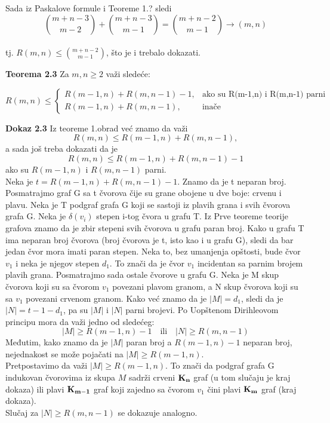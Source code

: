 \documentclass[12pt,a4paper]{article}
\begin{document}
	Sada iz Paskalove formule i Teoreme 1.? sledi 
	\[{m+n-3\choose m-2}+{m+n-3\choose m-1}={m+n-2\choose m-1}\rightarrow (m,n)\] 
	\\
	\vspace{0.7em} tj. $R(m,n) \leq {m+n-2\choose m-1}$, što je i trebalo dokazati. 
	
	{\noindent\fontsize{12pt}{12pt}\textbf{Teorema 2.3}}
	Za $m,n\geq 2$  važi sledeće:
	
	\[
   	 R(m,n)\leq 
		\begin{cases}
    		R(m-1,n)+R(m,n-1)-1,& \text{ako su R(m-1,n) i R(m,n-1) parni}\\
    	R(m-1,n)+R(m,n-1),      & \text{inače}
	\end{cases}
	\]
	
	{\noindent\fontsize{12pt}{12pt}\textbf{Dokaz 2.3}}
	Iz teoreme 1.obrad već znamo da važi
	\[R(m,n)\leq R(m-1,n)+R(m,n-1),\]
	a sada još treba dokazati da je
	\[R(m,n)\leq R(m-1,n)+R(m,n-1)-1\] 
	ako su $R(m-1,n)$ i $R(m,n-1)$ parni.
	\vspace{0.5em}
	\\
	\noindent Neka je $t=R(m-1,n)+R(m,n-1)-1$.
	Znamo da je t neparan broj. Posmatrajmo graf G sa t čvorova čije su grane obojene u dve boje: crvenu i plavu. Neka je T podgraf grafa G koji se sastoji iz plavih grana i svih čvorova grafa G. Neka je $\delta(v_i)$ stepen i-tog čvora u grafu T. Iz Prve teoreme teorije grafova znamo da je zbir stepeni svih čvorova u grafu paran broj. Kako u grafu T ima neparan broj čvorova (broj čvorova je t, isto kao i u grafu G), sledi da bar jedan čvor mora imati paran stepen. Neka to, bez umanjenja opštosti, bude čvor $v_1$ i neka je njegov stepen $d_1$. To znači da je čvor $v_1$ incidentan sa parnim brojem plavih grana. Posmatrajmo sada ostale čvorove u grafu G. Neka je M skup čvorova koji su sa čvorom $v_1$ povezani plavom granom, a N skup čvorova koji su sa $v_1$ povezani crvenom granom. Kako već znamo da je $|M| = d_1$,  sledi da je $|N| = t-1-d_1$, pa su $|M|$ i $|N|$ parni brojevi. Po Uopštenom Dirihleovom principu mora da važi jedno od sledećeg:
	\[|M|\geq R(m-1,n)-1 \quad \text{ili} \quad  |N|\geq R(m,n-1)\] 
	Međutim, kako znamo da je $|M|$ paran broj a $R(m-1,n)-1$ neparan broj, nejednakost se može pojačati na $|M|\geq R(m-1,n)$. \\
	Pretpostavimo da važi $|M|\geq R(m-1,n)$. To znači da podgraf grafa G indukovan čvorovima iz skupa $M$ sadrži crveni $\bf K_n$ graf (u tom slučaju je kraj dokaza) ili plavi $\bf K_{m-1}$ graf koji zajedno sa čvorom $v_1$ čini plavi $\bf K_{m}$ graf (kraj dokaza).\\
	Slučaj za $|N|\geq R(m,n-1)$ se dokazuje analogno.\\
	
\end{document}
